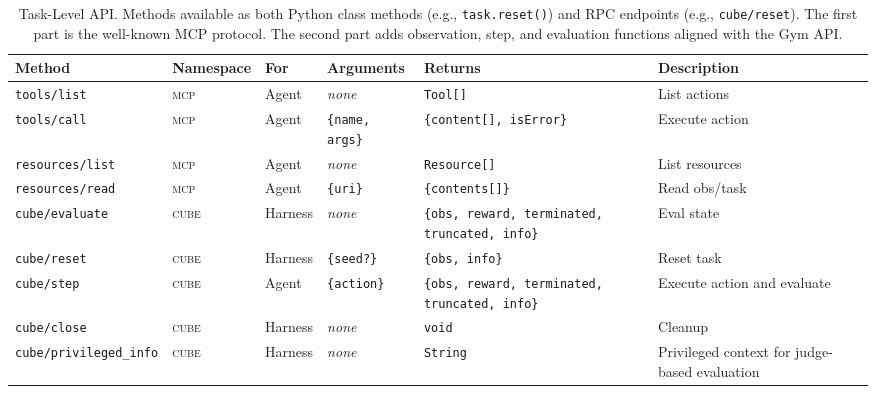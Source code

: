 \documentclass{article}
\theoremstyle{plain}
\theoremstyle{definition}
\theoremstyle{remark}
\begin{document}
\begin{table}[t]
\centering
\caption{Task-Level API. Methods available as both Python class methods (e.g., \texttt{task.reset()}) and RPC endpoints (e.g., \texttt{cube/reset}). The first part is the well-known MCP protocol. The second part adds observation, step, and evaluation functions aligned with the Gym API.}
\footnotesize
\begin{tabular}{L{2.4cm} C{0.8cm} C{1.1cm} L{2.4cm} L{4cm} L{3cm}}

\toprule
\textbf{Method} & \!\!\!\!\textbf{Namespace} & \textbf{For} & \textbf{Arguments} & \textbf{Returns} & \textbf{Description} \\
\midrule

{\scriptsize\texttt{tools/list}} & \textcolor{mcpgray}{\textsc{mcp}} & Agent & \textit{none} & \texttt{Tool[]} & List actions \\

{\scriptsize\texttt{tools/call}} & \textcolor{mcpgray}{\textsc{mcp}} & Agent & \texttt{\{name, args\}} & \texttt{\{content[], isError\}} & Execute action \\

{\scriptsize\texttt{resources/list}} & \textcolor{mcpgray}{\textsc{mcp}} & Agent & \textit{none} & \texttt{Resource[]} & List resources \\

{\scriptsize\texttt{resources/read}} & \textcolor{mcpgray}{\textsc{mcp}} & Agent & \texttt{\{uri\}} & \texttt{\{contents[]\}} & Read obs/task \\

\midrule

{\scriptsize\texttt{cube/evaluate}} & \textcolor{cubepurple}{\textsc{cube}} & Harness & \textit{none} & {\scriptsize\texttt{\{obs, reward, terminated, truncated, info\}}} & Eval state \\

{\scriptsize\texttt{cube/reset}} & \textcolor{cubepurple}{\textsc{cube}} & Harness & \texttt{\{seed?\}} & \texttt{\{obs, info\}} & Reset task \\   {\scriptsize\texttt{cube/step}} & \textcolor{cubepurple}{\textsc{cube}} & Agent & \texttt{\{action\}} & {\scriptsize\texttt{\{obs, reward, terminated, truncated, info\}}} & Execute action and evaluate \\

{\scriptsize\texttt{cube/close}} & \textcolor{cubepurple}{\textsc{cube}} & Harness & \textit{none} & \texttt{void} & Cleanup \\

{\scriptsize\texttt{cube/privileged\_info}} & \textcolor{cubepurple}{\textsc{cube}} & Harness & \textit{none} & \texttt{String} & Privileged context for judge-based evaluation \\

\bottomrule

\end{tabular}
\label{tab:task-api}
\end{table}
\end{document}
